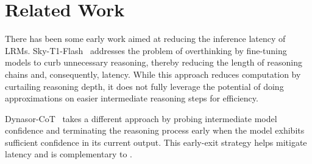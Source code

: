 \section{Related Work }

There has been some early work aimed at reducing the inference latency of LRMs. Sky-T1-Flash~\cite{sky_t1_flash} addresses the problem of overthinking by fine-tuning models to curb unnecessary reasoning, thereby reducing the length of reasoning chains and, consequently, latency. While this approach reduces computation by curtailing reasoning depth, it does not fully leverage the potential of doing approximations on easier intermediate reasoning steps for efficiency.

Dynasor-CoT~\cite{certaindex,dynasor_cot} takes a different approach by probing intermediate model confidence and terminating the reasoning process early when the model exhibits sufficient confidence in its current output. This early-exit strategy helps mitigate latency and is complementary to \name{}.
